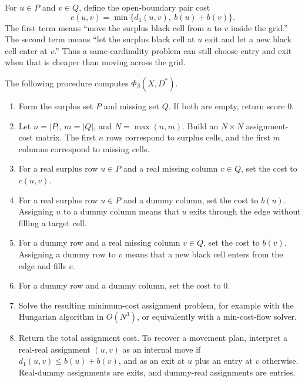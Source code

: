 \documentclass[11pt]{article}
\begin{document}
For \(u\in P\) and \(v\in Q\), define the open-boundary pair cost
\[
  c(u,v)=\min\{d_1(u,v),\ b(u)+b(v)\}.
\]
The first term means ``move the surplus black cell from \(u\) to \(v\) inside
the grid.'' The second term means ``let the surplus black cell at \(u\) exit
and let a new black cell enter at \(v\).'' Thus a same-cardinality problem can
still choose entry and exit when that is cheaper than moving across the grid.

The following procedure computes \(\Phi_\beta(X,D^\ast)\).

\begin{enumerate}[label=\textbf{B0.\arabic*.}]
  \item Form the surplus set \(P\) and missing set \(Q\). If both are empty,
  return score \(0\).

  \item Let \(n=|P|\), \(m=|Q|\), and \(N=\max(n,m)\). Build an
  \(N\times N\) assignment-cost matrix. The first \(n\) rows correspond to
  surplus cells, and the first \(m\) columns correspond to missing cells.

  \item For a real surplus row \(u\in P\) and a real missing column \(v\in Q\),
  set the cost to \(c(u,v)\).

  \item For a real surplus row \(u\in P\) and a dummy column, set the cost to
  \(b(u)\). Assigning \(u\) to a dummy column means that \(u\) exits through the
  edge without filling a target cell.

  \item For a dummy row and a real missing column \(v\in Q\), set the cost to
  \(b(v)\). Assigning a dummy row to \(v\) means that a new black cell enters
  from the edge and fills \(v\).

  \item For a dummy row and a dummy column, set the cost to \(0\).

  \item Solve the resulting minimum-cost assignment problem, for example with
  the Hungarian algorithm in \(O(N^3)\), or equivalently with a min-cost-flow
  solver.

  \item Return the total assignment cost. To recover a movement plan, interpret
  a real-real assignment \((u,v)\) as an internal move if
  \(d_1(u,v)\le b(u)+b(v)\), and as an exit at \(u\) plus an entry at \(v\)
  otherwise. Real-dummy assignments are exits, and dummy-real assignments are
  entries.
\end{enumerate}
\end{document}
